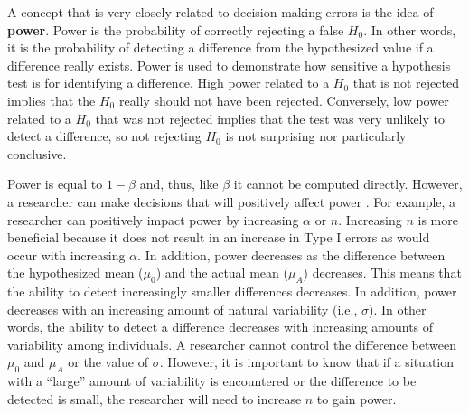\documentclass[10pt,openany]{book}\usepackage[]{graphicx}\usepackage[]{color}
\begin{document}
A concept that is very closely related to decision-making errors is the idea of \textbf{power}.  Power is the probability of correctly rejecting a false $H_{0}$.  In other words, it is the probability of detecting a difference from the hypothesized value if a difference really exists.  Power is used to demonstrate how sensitive a hypothesis test is for identifying a difference.  High power related to a $H_{0}$ that is not rejected implies that the $H_{0}$ really should not have been rejected.  Conversely, low power related to a $H_{0}$ that was not rejected implies that the test was very unlikely to detect a difference, so not rejecting $H_{0}$ is not surprising nor particularly conclusive.


Power is equal to $1-\beta$ and, thus, like $\beta$ it cannot be computed directly.  However, a researcher can make decisions that will positively affect power .  For example, a researcher can positively impact power by increasing $\alpha$ or $n$.  Increasing $n$ is more beneficial because it does not result in an increase in Type I errors as would occur with increasing $\alpha$.  In addition, power decreases as the difference between the hypothesized mean ($\mu_{0}$) and the actual mean ($\mu_{A}$) decreases.  This means that the ability to detect increasingly smaller differences decreases.  In addition, power decreases with an increasing amount of natural variability (i.e., $\sigma$).  In other words, the ability to detect a difference decreases with increasing amounts of variability among individuals.  A researcher cannot control the difference between $\mu_{0}$ and $\mu_{A}$ or the value of $\sigma$.  However, it is important to know that if a situation with a ``large'' amount of variability is encountered or the difference to be detected is small, the researcher will need to increase $n$ to gain power.


\vspace{-12pt}

\vspace{-12pt}

\vspace{-12pt}
\end{document}
